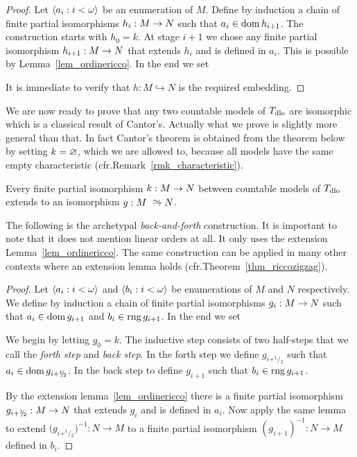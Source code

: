 \begin{proof}
Let $\langle a_i:i<\omega\rangle$ be an enumeration of $M$.
Define by induction a chain of finite partial isomorphisms $h_i:M\rightarrow N$ such that $a_i\in\mathop{\rm dom} h_{i+1}$.
The construction starts with $h_0=k$.
At stage $i+1$ we chose any finite partial isomorphism $h_{i+1}:M\rightarrow N$ that extends $h_i$ and is defined in $a_i$.
This is possible by Lemma~\ref{lem_ordinericco}.
In the end we set


It is immediate to verify that $h:M\hookrightarrow N$ is the required embedding.
\end{proof}




We are now ready to prove that any two countable models of $T_{\rm dlo}$ are isomorphic which is a classical result of Cantor's.
Actually what we prove is slightly more general than that.
In fact Cantor's theorem is obtained from the theorem below by setting $k=\varnothing$, which we are allowed to, because all models have the same empty characteristic (cfr.\@ Remark~\ref{rmk_characteristic}).

\begin{theorem}\label{thm_zigzagcantor}
Every finite partial isomorphism $k:M\rightarrow N$ between countable models of $T_{\rm dlo}$ extends to an isomorphism $g:M\isomap N$.
\end{theorem}

The following is the archetypal \emph{back-and-forth\/} construction.
It is important to note that it does not mention linear orders at all.
It only uses the extension Lemma~\ref{lem_ordinericco}.
The same construction can be applied in many other contexts where an extension lemma holds (cfr.\@ Theorem~\ref{thm_riccozigzag}).

\vspace*{-\parskip}
\begin{proof}
Let $\langle a_i:i<\omega\rangle$ and $\langle b_i:i<\omega\rangle$ be enumerations of $M$ and $N$ respectively.
We define by induction a chain of finite partial isomorphisms $g_i:M\rightarrow N$ such that $a_i\in\mathop{\rm dom} g_{i+1}$ and $b_i\in\mathop{\rm rng} g_{i+1}$.
In the end we set


We begin by letting $g_0=k$.
The inductive step consists of two half-steps that we call the \textit{forth step} and \textit{back step}.
In the forth step we define $g_{i+^1\!\!/\!_2}$ such that $a_i\in\mathop{\rm dom} g_{i+^1\!\!/\!_2}$.
In the back step to define $g_{i+1}$ such that $b_i\in\mathop{\rm rng} g_{i+1}$.

By the extension lemma~\ref{lem_ordinericco} there is a finite partial isomorphism $g_{i+^1\!\!/\!_2}:M\rightarrow N$ that extends $g_i$ and is defined in $a_i$.
Now apply the same lemma to extend $\big(g_{i+^1\!\!/\!_2}\big)^{-1}:N\to M$ to a finite partial isomorphism $(g_{i+1})^{-1}:N\to M$ defined in $b_i$.
\end{proof}


